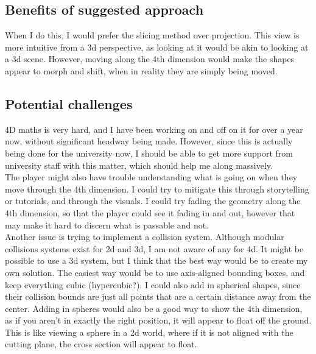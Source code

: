 \documentclass[12pt]{article}
\begin{document}
\subsection{Benefits of suggested approach}
When I do this, I would prefer the slicing method over projection. 
This view is more intuitive from a 3d perspective, as looking at it would be akin to looking at a 3d scene. 
However, moving along the 4th dimension would make the shapes appear to morph and shift, when in reality they are simply being moved.

\subsection{Potential challenges}
4D maths is very hard, and I have been working on and off on it for over a year now, without significant headway being made. 
However, since this is actually being done for the university now, I should be able to get more support from university staff with this matter, which should help me along massively.\\
The player might also have trouble understanding what is going on when they move through the 4th dimension. I could try to mitigate this through storytelling or tutorials, and through the visuals.
I could try fading the geometry along the 4th dimension, so that the player could see it fading in and out, however that may make it hard to discern what is passable and not.\\
Another issue is trying to implement a collision system. Although modular collisions systems exist for 2d and 3d, I am not aware of any for 4d. It might be possible to use a 3d system, but I think that the best way would be to create my own solution.
The easiest way would be to use axis-aligned bounding boxes, and keep everything cubic (hypercubic?).
I could also add in spherical shapes, since their collision bounds are just all points that are a certain distance away from the center.
Adding in spheres would also be a good way to show the 4th dimension, as if you aren't in exactly the right position, it will appear to float off the ground.
This is like viewing a sphere in a 2d world, where if it is not aligned with the cutting plane, the cross section will appear to float.
\end{document}
